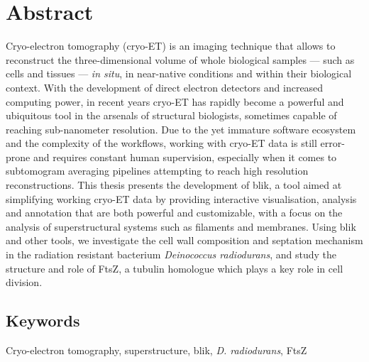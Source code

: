 \section*{Abstract}

Cryo-electron tomography (cryo-ET) is an imaging technique that allows to reconstruct the three-dimensional volume of whole biological samples --- such as cells and tissues --- \textit{in situ}, in near-native conditions and within their biological context.
With the development of direct electron detectors and increased computing power, in recent years cryo-ET has rapidly become a powerful and ubiquitous tool in the arsenals of structural biologists, sometimes capable of reaching sub-nanometer resolution.
Due to the yet immature software ecosystem and the complexity of the workflows, working with cryo-ET data is still error-prone and requires constant human supervision, especially when it comes to subtomogram averaging pipelines attempting to reach high resolution reconstructions.
This thesis presents the development of blik, a tool aimed at simplifying working cryo-ET data by providing interactive visualisation, analysis and annotation that are both powerful and customizable, with a focus on the analysis of superstructural systems such as filaments and membranes.
Using blik and other tools, we investigate the cell wall composition and septation mechanism in the radiation resistant bacterium \textit{Deinococcus radiodurans}, and study the structure and role of FtsZ, a tubulin homologue which plays a key role in cell division.

\subsection*{Keywords}
Cryo-electron tomography, superstructure, blik, \textit{D. radiodurans}, FtsZ

\newpage
